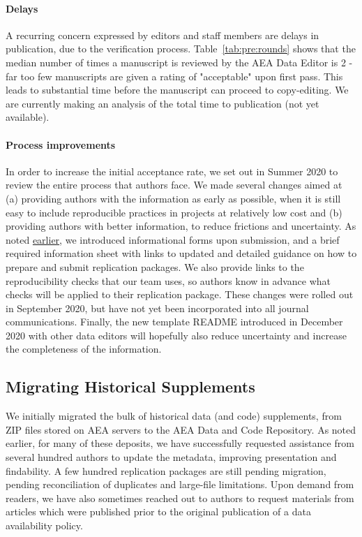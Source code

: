 \documentclass[PP]{AEA}
\newcommand{\aeadcr}{AEA Data and Code Repository}
\begin{document}
\paragraph{Delays} 

A recurring concern expressed by editors and staff members are delays in publication, due to the verification process. Table~\ref{tab:pre:rounds} shows that the median number of times a manuscript is reviewed by the AEA Data Editor is 2 - far too few manuscripts are given a rating of "acceptable" upon first pass. This leads to substantial time before the manuscript can proceed to copy-editing. We are currently making an analysis of the total time to publication (not yet available).

\paragraph{Process improvements}

In order to increase the initial acceptance rate, we set out in Summer 2020 to review the entire process that authors face. We made several changes aimed at (a) providing authors with the information as early as possible, when it is still easy to include reproducible practices in projects at relatively low cost and (b) providing authors with better information, to reduce frictions and uncertainty. As noted  \hyperref[sec:dcap]{earlier}, we introduced informational forms upon submission, and a brief required information sheet with links to updated and detailed guidance on how to prepare and submit replication packages. We also provide links to the reproducibility checks that our team uses, so authors know in advance what checks will be applied to their replication package. These changes were rolled out in September 2020, but have not yet been incorporated into all journal communications. Finally, the new template README \citep{READMEv1.0.0} introduced in December 2020 with other data editors will hopefully also reduce uncertainty and increase the completeness of the information. 


\subsection{Migrating Historical Supplements}
\label{sec:migration}

We initially migrated the bulk of historical data (and code) supplements, from ZIP files stored on AEA servers to the \aeadcr{}. As noted earlier, for many of these deposits, we have successfully requested assistance from several hundred authors to update the metadata, improving presentation and findability. A few hundred replication packages are still pending migration, pending reconciliation of duplicates and large-file limitations. Upon demand from readers, we have also sometimes reached out to authors to request materials from articles which were published prior to the original publication of a data availability policy. 
\end{document}
